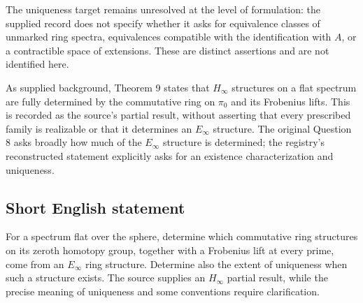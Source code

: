 \documentclass[11pt]{article}
\begin{document}
The uniqueness target remains unresolved at the level of formulation: the supplied record does not specify whether it asks for equivalence classes of unmarked ring spectra, equivalences compatible with the identification with \(A\), or a contractible space of extensions. These are distinct assertions and are not identified here.

As supplied background, Theorem 9 states that \(H_\infty\) structures on a flat spectrum are fully determined by the commutative ring on \(\pi_0\) and its Frobenius lifts. This is recorded as the source's partial result, without asserting that every prescribed family is realizable or that it determines an \(E_\infty\) structure. The original Question 8 asks broadly how much of the \(E_\infty\) structure is determined; the registry's reconstructed statement explicitly asks for an existence characterization and uniqueness.
\subsection{Short English statement}
For a spectrum flat over the sphere, determine which commutative ring structures on its zeroth homotopy group, together with a Frobenius lift at every prime, come from an \(E_\infty\) ring structure. Determine also the extent of uniqueness when such a structure exists. The source supplies an \(H_\infty\) partial result, while the precise meaning of uniqueness and some conventions require clarification.
\end{document}
